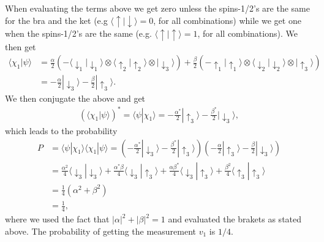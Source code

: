 \documentclass[a4paper,10pt]{article}
\begin{document}
When evaluating the terms above we get zero unless the spins-1/2's are the same for the bra and the ket (e.g $\langle \uparrow | \downarrow \rangle = 0$, for all combinations) while we get one when the spins-1/2's are the same (e.g. $\langle \uparrow | \uparrow
\rangle = 1$, for all combinations). We then get
%
\begin{align*}
\langle \chi_1 | \psi \rangle &= \frac{\alpha}{2}\left(-\langle\downarrow_1|\downarrow_1\rangle \otimes \langle \uparrow_2|\uparrow_2\rangle \otimes |\downarrow_3\rangle\right) + \frac{\beta}{2}\left(-\uparrow_1|\uparrow_1\rangle \otimes \langle \downarrow_2|\downarrow_2\rangle \otimes |\uparrow_3\rangle \right) \\
&= -\frac{\alpha}{2}|\downarrow_3\rangle - \frac{\beta}{2}|\uparrow_3\rangle.
\end{align*}
%
We then conjugate the above and get
%
\begin{align*}
\left(\langle \chi_1 |\psi\rangle \right)^* = \langle \psi | \chi_1 \rangle = -\frac{\alpha^*}{2} |\uparrow_3\rangle - \frac{\beta^*}{2}|\downarrow_3\rangle ,
\end{align*}
%
which leads to the probability
%
\begin{align*}
P &= \langle \psi | \chi_1\rangle \langle \chi_1|\psi \rangle = \left(-\frac{\alpha^*}{2}|\downarrow_3\rangle - \frac{\beta^*}{2}|\uparrow_3\rangle\right) \left( -\frac{\alpha}{2} |\uparrow_3\rangle - \frac{\beta}{2}|\downarrow_3\rangle\right) \\
&= \frac{\alpha^2}{4}\langle \downarrow_3 |\downarrow_3 \rangle + \frac{\alpha^* \beta}{4}\langle \downarrow_3 |\uparrow_3\rangle + \frac{\alpha \beta^*}{4}\langle \downarrow_3 |\uparrow_3\rangle + \frac{\beta^2}{4}\langle\uparrow_3 | \uparrow_3\rangle \\
&= \frac{1}{4} \left(\alpha^2 + \beta^2\right) \\
&= \frac{1}{4},
\end{align*}
where we used the fact that $|\alpha|^2 + |\beta|^2 = 1$ and evaluated the brakets as stated above. The probability of getting the measurement $v_1$ is $1/4$.
\end{document}

